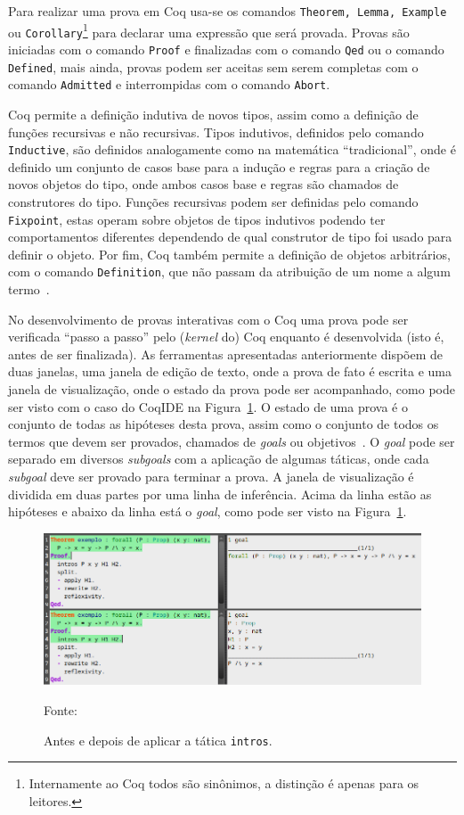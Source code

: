 		Para realizar uma prova em Coq usa-se os comandos \texttt{Theorem, Lemma, Example} ou \texttt{Corollary}\footnote{Internamente ao Coq todos são sinônimos, a
		distinção é apenas para os leitores.} para declarar uma expressão que será provada. Provas são iniciadas com o comando \texttt{Proof} e
		finalizadas com o comando \texttt{Qed} ou o comando \texttt{Defined}, mais ainda, provas podem ser aceitas sem serem completas com o comando
		\texttt{Admitted} e interrompidas com o comando \texttt{Abort}.

		Coq permite a definição indutiva de novos tipos, assim como a definição de funções recursivas e não recursivas. Tipos indutivos, definidos pelo comando
		\texttt{Inductive}, são definidos analogamente como na matemática ``tradicional'', onde é definido um conjunto de casos base para a indução e
		regras para a criação de novos objetos do tipo, onde ambos casos base e regras são chamados de construtores do tipo.
		Funções recursivas podem ser definidas pelo comando \texttt{Fixpoint}, estas operam sobre objetos de tipos indutivos podendo
		ter comportamentos diferentes dependendo de qual construtor de tipo foi usado para definir o objeto. Por fim, Coq também permite
		a definição de objetos arbitrários, com o comando \texttt{Definition}, que não passam da atribuição de um nome a algum termo~\cite{pierce2021software}.

		No desenvolvimento de provas interativas com o Coq uma prova pode ser verificada ``passo a passo'' pelo (\textit{kernel} do) Coq enquanto é desenvolvida (isto é, antes de
		ser finalizada). As ferramentas apresentadas anteriormente dispõem de duas janelas, uma janela de edição de texto,
		onde a prova de fato é escrita e uma janela de visualização, onde o estado da prova pode ser acompanhado, como pode ser visto com o caso do CoqIDE
		na Figura~\ref{fig:CoqIDEIntros}. O estado de uma prova é o conjunto de todas as hipóteses desta prova, assim como o conjunto de todos os termos que
		devem ser provados, chamados de \textit{goals} ou objetivos~\cite{coqteam2022manual}. O \textit{goal} pode ser separado em diversos \textit{subgoals}
		com a aplicação de algumas táticas, onde cada \textit{subgoal} deve ser provado para terminar a prova.
		A janela de visualização é dividida em duas partes por uma linha de inferência. Acima da linha estão as hipóteses e abaixo da linha está o \textit{goal},
		como pode ser visto na Figura~\ref{fig:CoqIDEIntros}.
		\begin{figure}[htpb!]
			\centering
			\includegraphics[scale=.5]{Figuras/CoqIDEIntrosJoin.png}
			\caption{Antes e depois de aplicar a tática \texttt{intros}.}
			\small{Fonte: \me}
			\label{fig:CoqIDEIntros}
		\end{figure}


